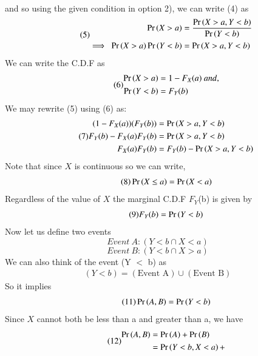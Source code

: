 \documentclass[journal,12pt,twocolumn]{IEEEtran}
\begin{document}
\begin{enumerate}
\begin{align}
\begin{split}
    \end{split}
\end{align}
and so using the given condition in option 2), we can write (4) as
\begin{align}\tag{5}
    \begin{split}
        \Pr\left(X > a\right) &= \frac{\Pr\left(X > a, Y < b\right)}{\Pr\left(Y < b\right)}\\
        \implies\ \Pr\left(X > a\right)\Pr\left(Y < b\right) &= \Pr\left(X > a, Y < b\right)
    \end{split}
\end{align}
We can write the C.D.F as 
\begin{align}\tag{6}
    \begin{split}
        \Pr\left(X > a\right) &= 1 - F_X(a)\ and,\\
        \Pr\left(Y < b\right) &= F_Y(b)
    \end{split}
\end{align}
We may rewrite (5) using (6) as:
\begin{align}\tag{7}
    \begin{split}
        (1 - F_X(a))(F_Y(b)) &= \Pr\left(X > a, Y < b\right)\\
        F_Y(b) - F_X(a)F_Y(b) &= \Pr\left(X > a, Y < b\right)\\
        F_X(a)F_Y(b) &= F_Y(b) - \Pr\left(X > a, Y < b\right)
    \end{split}
\end{align}
Note that since $X$ is continuous so we can write, 
\begin{align}\tag{8}
    \Pr\left(X \leq a\right) = \Pr\left(X < a\right)
\end{align}
Regardless of the value of $X$ the marginal C.D.F $F_Y$(b) is given by
\begin{align}\tag{9}
    F_Y(b) = \Pr\left(Y < b\right)
\end{align}
Now let us define two events 
$$Event\ A: (Y < b \cap X < a)$$ $$Event\ B: (Y < b \cap X > a)$$
We can also think of the event (Y $\mathop{<}$ b) as 
\begin{align}\tag{10}
    (Y < b) = (\text{Event A}) \cup (\text{Event B})
\end{align}
So it implies
\begin{align}\tag{11}
    \Pr\left(A, B\right) = \Pr\left(Y < b\right)
\end{align}
Since $X$ cannot both be less than a and greater than a, we have 
\begin{align}\tag{12}
    \begin{split}
        \pr{A, B} &= \pr{A} + \pr{B}\\
                  &= \pr{Y < b, X < a} +\\

\end{split}
\end{align}
\end{enumerate}
\end{document}
